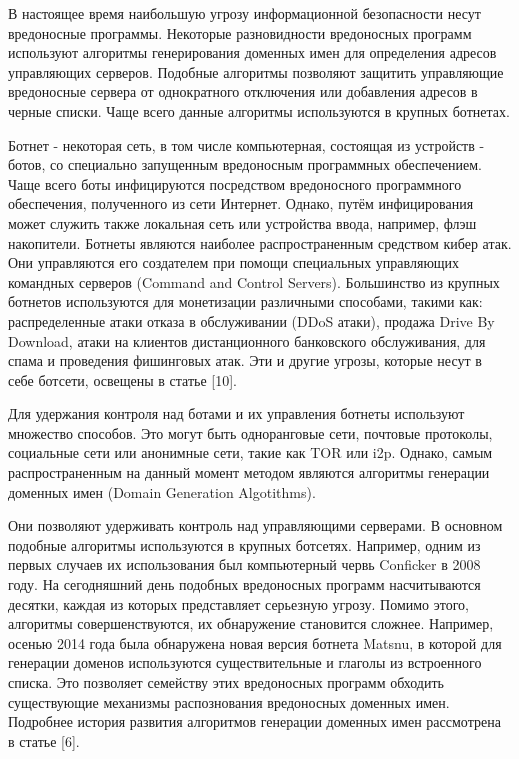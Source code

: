 
В настоящее время наибольшую угрозу информационной безопасности несут вредоносные программы. Некоторые разновидности вредоносных программ используют алгоритмы генерирования доменных имен для определения адресов управляющих серверов. Подобные алгоритмы позволяют защитить управляющие вредоносные сервера от однократного отключения или добавления адресов в черные списки. Чаще всего данные алгоритмы используются в крупных ботнетах. 

Ботнет - некоторая сеть, в том числе компьютерная, состоящая из устройств - ботов, со специально запущенным вредоносным программных обеспечением. Чаще всего боты инфицируются посредством вредоносного программного обеспечения, полученного из сети Интернет. Однако, путём инфицирования может служить также локальная сеть или устройства ввода, например, флэш накопители. Ботнеты являются наиболее распространенным средством кибер атак. Они управляются его создателем при помощи специальных управляющих командных серверов (Command and Control Servers). Большинство из крупных ботнетов используются для монетизации различными способами, такими как: распределенные атаки отказа в обслуживании (DDoS атаки), продажа Drive By Download, атаки на клиентов дистанционного банковского обслуживания, для спама и проведения фишинговых атак. Эти и другие угрозы, которые несут в себе ботсети, освещены в статье [10].

Для удержания контроля над ботами и их управления ботнеты используют множество способов. Это могут быть одноранговые сети, почтовые протоколы, социальные сети или анонимные сети, такие как TOR или i2p.
Однако, самым распространенным на данный момент методом являются алгоритмы генерации доменных имен (Domain Generation Algotithms).

Они позволяют удерживать контроль над управляющими серверами. В основном подобные алгоритмы используются в крупных ботсетях. Например, одним из первых случаев их использования был компьютерный червь Conficker в 2008 году. На сегодняшний день подобных вредоносных программ насчитываются десятки, каждая из которых представляет серьезную угрозу. Помимо этого, алгоритмы совершенствуются, их обнаружение становится сложнее. Например, осенью 2014 года была обнаружена новая версия ботнета Matsnu, в которой для генерации доменов используются существительные и глаголы из встроенного списка. Это позволяет семейству этих вредоносных программ обходить существующие механизмы распознования вредоносных доменных имен. Подробнее история развития алгоритмов генерации доменных имен рассмотрена в статье [6].

